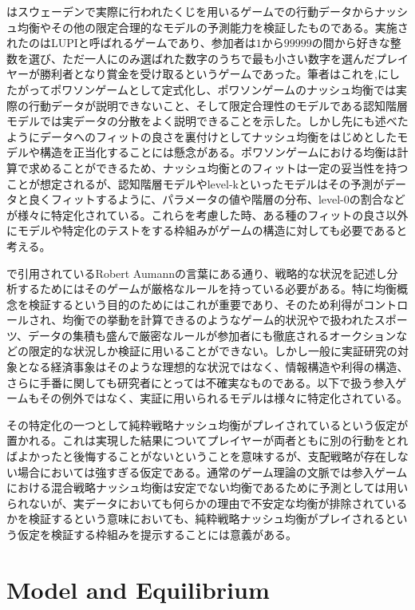\documentclass{jsarticle}
\begin{document}
\cite{Ostling2011}はスウェーデンで実際に行われたくじを用いるゲームでの行動データからナッシュ均衡やその他の限定合理的なモデルの予測能力を検証したものである。実施されたのはLUPIと呼ばれるゲームであり、参加者は$1$から$99999$の間から好きな整数を選び、ただ一人にのみ選ばれた数字のうちで最も小さい数字を選んだプレイヤーが勝利者となり賞金を受け取るというゲームであった。筆者はこれを\cite{Myerson1998},\cite{Myerson2000}にしたがってポワソンゲームとして定式化し、ポワソンゲームのナッシュ均衡では実際の行動データが説明できないこと、そして限定合理性のモデルである認知階層モデルでは実データの分散をよく説明できることを示した。しかし先にも述べたようにデータへのフィットの良さを裏付けとしてナッシュ均衡をはじめとしたモデルや構造を正当化することには懸念がある。ポワソンゲームにおける均衡は計算で求めることができるため、ナッシュ均衡とのフィットは一定の妥当性を持つことが想定されるが、認知階層モデルやlevel-kといったモデルはその予測がデータと良くフィットするように、パラメータの値や階層の分布、level-0の割合などが様々に特定化されている。これらを考慮した時、ある種のフィットの良さ以外にモデルや特定化のテストをする枠組みがゲームの構造に対しても必要であると考える。

\cite{Ostling2011}で引用されているRobert Aumannの言葉にある通り、戦略的な状況を記述し分析するためにはそのゲームが厳格なルールを持っている必要がある。特に均衡概念を検証するという目的のためにはこれが重要であり、そのため利得がコントロールされ、均衡での挙動を計算できる\cite{Ostling2011}のようなゲーム的状況や\cite{Chiappori2002}で扱われたスポーツ、データの集積も盛んで厳密なルールが参加者にも徹底されるオークションなどの限定的な状況しか検証に用いることができない。しかし一般に実証研究の対象となる経済事象はそのような理想的な状況ではなく、情報構造や利得の構造、さらに手番に関しても研究者にとっては不確実なものである。以下で扱う参入ゲームもその例外ではなく、実証に用いられるモデルは様々に特定化されている。

その特定化の一つとして純粋戦略ナッシュ均衡がプレイされているという仮定が置かれる。これは実現した結果についてプレイヤーが両者ともに別の行動をとればよかったと後悔することがないということを意味するが、支配戦略が存在しない場合においては強すぎる仮定である。通常のゲーム理論の文脈では参入ゲームにおける混合戦略ナッシュ均衡は安定でない均衡であるために予測としては用いられないが、実データにおいても何らかの理由で不安定な均衡が排除されているかを検証するという意味においても、純粋戦略ナッシュ均衡がプレイされるという仮定を検証する枠組みを提示することには意義がある。

\section{Model and Equilibrium}
\end{document}
